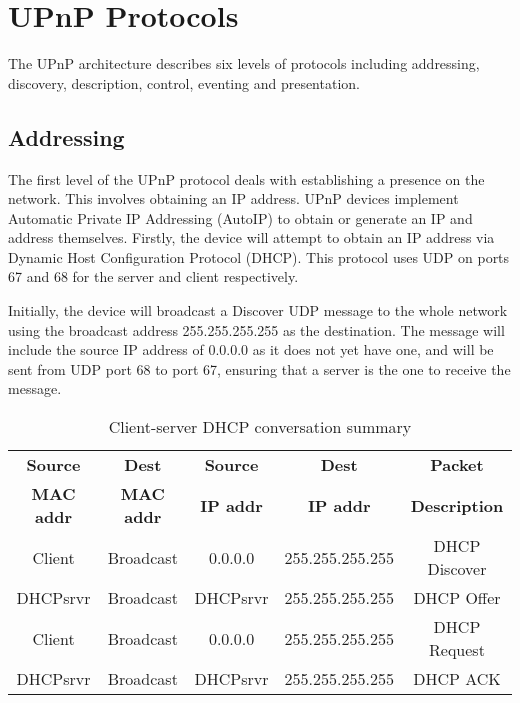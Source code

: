 \section{UPnP Protocols}

The UPnP architecture describes six levels of protocols including addressing, discovery, description, control, eventing and presentation.

\subsection{Addressing}

The first level of the UPnP protocol deals with establishing a presence on the network. This involves obtaining an IP address. UPnP devices implement Automatic Private IP Addressing (AutoIP)\cite{autoip} to obtain or generate an IP and address themselves. Firstly, the device will attempt to obtain an IP address via Dynamic Host Configuration Protocol (DHCP)\cite{UPnPWindowsXP}. This protocol uses UDP on ports 67 and 68 for the server and client respectively.

Initially, the device will broadcast a Discover UDP message to the whole network using the broadcast address 255.255.255.255 as the destination. The message will include the source IP address of 0.0.0.0 as it does not yet have one, and will be sent from UDP port 68 to port 67\cite{dhcp}, ensuring that a server is the one to receive the message.

\begin{center}
\begin{table}[h!]
\begin{tabular}{|c|c|c|c|c|}
	\hline 
	\textbf{Source}&\textbf{Dest}&\textbf{Source}&\textbf{Dest}&\textbf{Packet} \\
	\textbf{MAC addr}&\textbf{MAC addr}&\textbf{IP addr}&\textbf{IP addr}&\textbf{Description} \\
	\hline
	Client&Broadcast&0.0.0.0&255.255.255.255&DHCP Discover \\
	\hline
   DHCPsrvr&Broadcast&DHCPsrvr&255.255.255.255&DHCP Offer \\
   \hline
   Client&Broadcast&0.0.0.0&255.255.255.255&DHCP Request \\
   \hline
   DHCPsrvr&Broadcast&DHCPsrvr&255.255.255.255&DHCP ACK \\
   \hline
\end{tabular}

\caption{Client-server DHCP conversation summary\cite{microsoft-dhcp}} 
\label{table:1}
\end{table}
\end{center}

